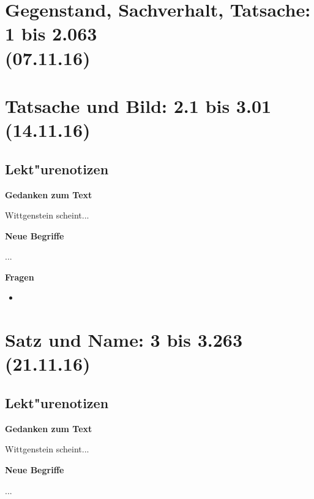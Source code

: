 \documentclass[]{scrartcl}
\begin{document}
\section{Gegenstand, Sachverhalt, Tatsache: 1 bis 2.063\\(07.11.16)}

\section{Tatsache und Bild: 2.1 bis 3.01\\(14.11.16)}

\subsection{Lekt"urenotizen}
\textbf{Gedanken zum Text}

Wittgenstein scheint...

\vspace{10pt}
\textbf{Neue Begriffe}

\begin{description}[leftmargin=!,labelwidth=\widthof{\bfseries Sachverhalt}]
  \item[Bild] ...
  \item[Tatsache] 
\end{description}

\textbf{Fragen}

\begin{itemize}
  \item 
\end{itemize}

\section{Satz und Name: 3 bis 3.263\\(21.11.16)}


\subsection{Lekt"urenotizen}
\textbf{Gedanken zum Text}

Wittgenstein scheint...

\vspace{10pt}
\textbf{Neue Begriffe}

\begin{description}[leftmargin=!,labelwidth=\widthof{\bfseries Sachverhalt}]
  \item[Bild] ...
  \item[Tatsache] 
\end{description}
\end{document}
